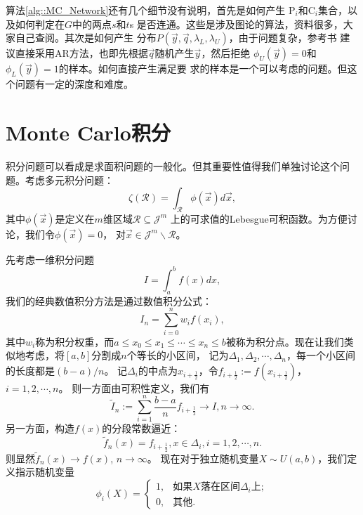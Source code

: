 算法\ref{alg::MC_Network}还有几个细节没有说明，首先是如何产生
$\mathrm{P}_i$和$\mathrm{C}_i$集合，以及如何判定在$G$中的两点$s$和$t$s
是否连通。这些是涉及图论的算法，资料很多，大家自己查阅。其次是如何产生
分布$P(\vec{y}, \vec{q}, \lambda_L, \lambda_U)$，由于问题复杂，参考书
建议直接采用AR方法，也即先根据$\vec{q}$随机产生$\vec{y}$，然后拒绝
$\phi_U(\vec{y}) = 0$和$\phi_L(\vec{y}) = 1$的样本。如何直接产生满足要
求的样本是一个可以考虑的问题。但这个问题有一定的深度和难度。

\section{Monte Carlo积分}

积分问题可以看成是求面积问题的一般化。但其重要性值得我们单独讨论这个问
题。考虑多元积分问题：
\begin{equation}
  \zeta(\mathscr{R}) = \int_{\mathscr{R}}\phi(\vec{x}) d\vec{x},
  \label{eq::mc_integeration}
\end{equation}
其中$\phi(\vec{x})$是定义在$m$维区域$\mathscr{R} \subseteq \mathscr{J}^m$
上的可求值的Lebesgue可积函数。为方便讨论，我们令$\phi(\vec{x}) = 0$，
对$\vec{x} \in \mathscr{J}^m \backslash \mathscr{R}$。

先考虑一维积分问题
$$
I = \int_a^b f(x) dx,
$$
我们的经典数值积分方法是通过数值积分公式：
$$
I_n = \sum_{i = 0}^n w_if(x_i),
$$
其中$w_i$称为积分权重，而$a \leq x_0 \leq x_1 \leq \cdots \leq x_n
\leq b$被称为积分点。现在让我们类似地考虑，将$[a, b]$分割成$n$个等长的小区间，
记为$\Delta_1, \Delta_2, \cdots, \Delta_n$，每一个小区间的长度都是$(b - a) / n$。
记$\Delta_i$的中点为$x_{i + \frac{1}{2}}$，令$f_{i + \frac{1}{2}} := f(x_{i + \frac{1}{2}})$，$i = 1, 2, \cdots, n$。
则一方面由可积性定义，我们有
\begin{equation}
  \tilde{I}_n := \sum_{i = 1}^n \frac{b - a}{n}f_{i + \frac{1}{2}} \to I, n \to \infty.
  \label{eq::MC_integeration_eI}
\end{equation}
另一方面，构造$f(x)$的分段常数逼近：
\begin{equation}
  \tilde{f}_n(x) = f_{i + \frac{1}{2}}, x \in \Delta_i, i = 1, 2, \cdots, n.
  \label{eq::MC_approximation_kernel}
\end{equation}
则显然$\tilde{f}_n(x) \to f(x)$, $n \to \infty$。
现在对于独立随机变量$X \sim U(a, b)$，我们定义指示随机变量
$$
 \phi_i(X) = \left\{
 \begin{array}{ll}
   1, & \mbox{如果$X$落在区间$\Delta_i$上};\\
   0, & \mbox{其他}.
 \end{array}
 \right.
 $$

